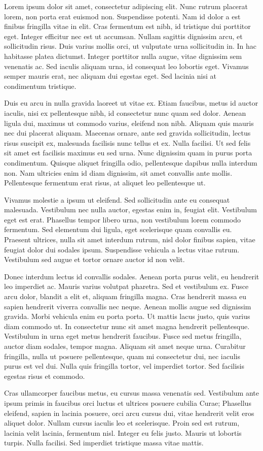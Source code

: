 Lorem ipsum dolor sit amet, consectetur adipiscing elit. Nunc rutrum placerat lorem, non porta erat euismod non. Suspendisse potenti. Nam id dolor a est finibus fringilla vitae in elit. Cras fermentum est nibh, id tristique dui porttitor eget. Integer efficitur nec est ut accumsan. Nullam sagittis dignissim arcu, et sollicitudin risus. Duis varius mollis orci, ut vulputate urna sollicitudin in. In hac habitasse platea dictumst. Integer porttitor nulla augue, vitae dignissim sem venenatis ac. Sed iaculis aliquam urna, id consequat leo lobortis eget. Vivamus semper mauris erat, nec aliquam dui egestas eget. Sed lacinia nisi at condimentum tristique.

Duis eu arcu in nulla gravida laoreet ut vitae ex. Etiam faucibus, metus id auctor iaculis, nisi ex pellentesque nibh, id consectetur nunc quam sed dolor. Aenean ligula dui, maximus ut commodo varius, eleifend non nibh. Aliquam quis mauris nec dui placerat aliquam. Maecenas ornare, ante sed gravida sollicitudin, lectus risus suscipit ex, malesuada facilisis nunc tellus et ex. Nulla facilisi. Ut sed felis sit amet est facilisis maximus eu sed urna. Nunc dignissim quam in purus porta condimentum. Quisque aliquet fringilla odio, pellentesque dapibus nulla interdum non. Nam ultricies enim id diam dignissim, sit amet convallis ante mollis. Pellentesque fermentum erat risus, at aliquet leo pellentesque ut.

Vivamus molestie a ipsum ut eleifend. Sed sollicitudin ante eu consequat malesuada. Vestibulum nec nulla auctor, egestas enim in, feugiat elit. Vestibulum eget est erat. Phasellus tempor libero urna, non vestibulum lorem commodo fermentum. Sed elementum dui ligula, eget scelerisque quam convallis eu. Praesent ultrices, nulla sit amet interdum rutrum, nisl dolor finibus sapien, vitae feugiat dolor dui sodales ipsum. Suspendisse vehicula a lectus vitae rutrum. Vestibulum sed augue et tortor ornare auctor id non velit.

Donec interdum lectus id convallis sodales. Aenean porta purus velit, eu hendrerit leo imperdiet ac. Mauris varius volutpat pharetra. Sed et vestibulum ex. Fusce arcu dolor, blandit a elit et, aliquam fringilla magna. Cras hendrerit massa eu sapien hendrerit viverra convallis nec neque. Aenean mollis augue sed dignissim gravida. Morbi vehicula enim eu porta porta. Ut mattis lacus justo, quis varius diam commodo ut. In consectetur nunc sit amet magna hendrerit pellentesque. Vestibulum in urna eget metus hendrerit faucibus. Fusce sed metus fringilla, auctor diam sodales, tempor magna. Aliquam sit amet neque urna. Curabitur fringilla, nulla ut posuere pellentesque, quam mi consectetur dui, nec iaculis purus est vel dui. Nulla quis fringilla tortor, vel imperdiet tortor. Sed facilisis egestas risus et commodo.

Cras ullamcorper faucibus metus, eu cursus massa venenatis sed. Vestibulum ante ipsum primis in faucibus orci luctus et ultrices posuere cubilia Curae; Phasellus eleifend, sapien in lacinia posuere, orci arcu cursus dui, vitae hendrerit velit eros aliquet dolor. Nullam cursus iaculis leo et scelerisque. Proin sed est rutrum, lacinia velit lacinia, fermentum nisl. Integer eu felis justo. Mauris ut lobortis turpis. Nulla facilisi. Sed imperdiet tristique massa vitae mattis.